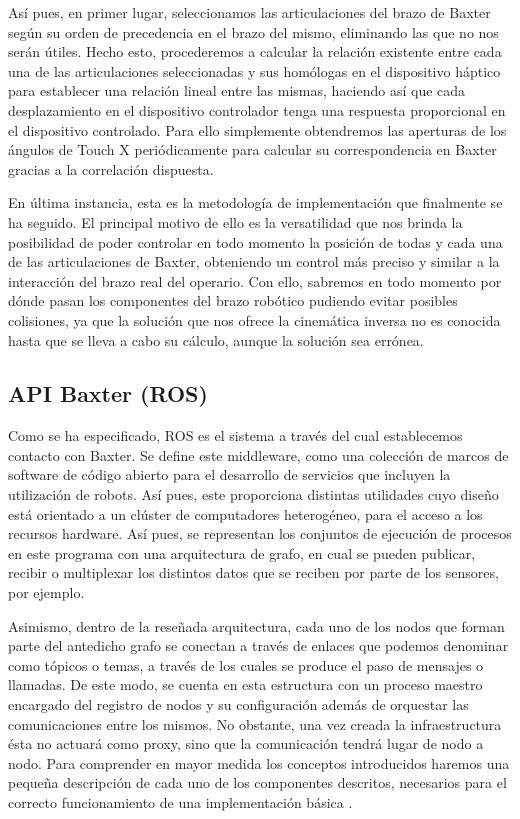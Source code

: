 Así pues, en primer lugar, seleccionamos las articulaciones del brazo de Baxter según su orden de precedencia en el brazo del mismo, eliminando las que no nos serán útiles. Hecho esto, procederemos a calcular la relación existente entre cada una de las articulaciones seleccionadas y sus homólogas en el dispositivo háptico para establecer una relación lineal entre las mismas, haciendo así que cada desplazamiento en el dispositivo controlador tenga una respuesta proporcional en el dispositivo controlado. Para ello simplemente obtendremos las aperturas de los ángulos de Touch X periódicamente para calcular su correspondencia en Baxter gracias a la correlación dispuesta.

En última instancia, esta es la metodología de implementación que finalmente se ha seguido. El principal motivo de ello es la versatilidad que nos brinda la posibilidad de poder controlar en todo momento la posición de todas y cada una de las articulaciones de Baxter, obteniendo un control más preciso y similar a la interacción del brazo real del operario. Con ello, sabremos en todo momento por dónde pasan los componentes del brazo robótico pudiendo evitar posibles colisiones, ya que la solución que nos ofrece la cinemática inversa no es conocida hasta que se lleva a cabo su cálculo, aunque la solución sea errónea.

\subsection{API Baxter (ROS)}

Como se ha especificado, ROS es el sistema a través del cual establecemos contacto con Baxter. Se define este middleware, como una colección de marcos de software de código abierto para el desarrollo de servicios que incluyen la utilización de robots. Así pues, este proporciona distintas utilidades cuyo diseño está orientado a un clúster de computadores heterogéneo, para el acceso a los recursos hardware. Así pues, se representan los conjuntos de ejecución de procesos en este programa con una arquitectura de grafo, en cual se pueden publicar, recibir o multiplexar los distintos datos que se reciben por parte de los sensores, por ejemplo.

Asimismo, dentro de la reseñada arquitectura, cada uno de los nodos que forman parte del antedicho grafo se conectan a través de enlaces que podemos denominar como tópicos o temas, a través de los cuales se produce el paso de mensajes o llamadas. De este modo, se cuenta en esta estructura con un proceso maestro encargado del registro de nodos y su configuración además de orquestar las comunicaciones entre los mismos. No obstante, una vez creada la infraestructura ésta no actuará como proxy, sino que la comunicación tendrá lugar de nodo a nodo. Para comprender en mayor medida los conceptos introducidos haremos una pequeña descripción de cada uno de los componentes descritos, necesarios para el correcto funcionamiento de una implementación básica \cite{71}.


